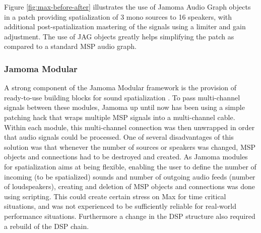 \documentclass[twoside,a4paper]{article}
\begin{document}
Figure \ref{fig:max-before-after} illustrates the use of Jamoma Audio Graph objects in a patch providing spatialization of 3 mono sources to 16 speakers, with additional post-spatialization mastering of the signals using a limiter and gain adjustment.
The use of JAG objects greatly helps simplifying the patch as compared to a standard MSP audio graph. 



\subsubsection{Jamoma Modular} %

A strong component of the Jamoma Modular framework is the provision of ready-to-use building blocks for sound spatialization \cite{Peters:2009}.
To pass multi-channel signals between these modules, Jamoma up until now has been using a simple patching hack that wraps multiple MSP signals into a multi-channel cable. Within each module, this multi-channel connection was then unwrapped in order that audio signals could be processed. 
One of several disadvantages of this solution was that whenever the number of sources or speakers was changed, MSP objects and connections had to be destroyed and created.
As Jamoma modules for spatialization aims at being flexible, enabling the user to define the number of incoming (to be spatialized) sounds and number of outgoing audio feeds (number of loudspeakers), creating and deletion of MSP objects and connections was done using scripting.
This could create certain stress on Max for time critical situations, and was not experienced to be sufficiently reliable for real-world performance situations.
Furthermore a change in the DSP structure also required a rebuild of the DSP chain.
\end{document}
